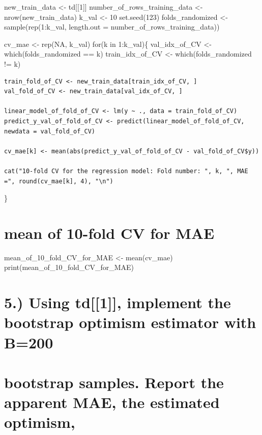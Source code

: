 \documentclass[
  letterpaper,
  DIV=11,
  numbers=noendperiod]{scrreprt}
\begin{document}
new\_train\_data \textless- td{[}{[}1{]}{]}
number\_of\_rows\_training\_data \textless- nrow(new\_train\_data)
k\_val \textless- 10 set.seed(123) folds\_randomized \textless-
sample(rep(1:k\_val, length.out = number\_of\_rows\_training\_data))

cv\_mae \textless- rep(NA, k\_val) for(k in 1:k\_val)\{ val\_idx\_of\_CV
\textless- which(folds\_randomized == k) train\_idx\_of\_CV \textless-
which(folds\_randomized != k)

\begin{verbatim}
train_fold_of_CV <- new_train_data[train_idx_of_CV, ]
val_fold_of_CV <- new_train_data[val_idx_of_CV, ]

linear_model_of_fold_of_CV <- lm(y ~ ., data = train_fold_of_CV)
predict_y_val_of_fold_of_CV <- predict(linear_model_of_fold_of_CV, newdata = val_fold_of_CV)

cv_mae[k] <- mean(abs(predict_y_val_of_fold_of_CV - val_fold_of_CV$y))

cat("10-fold CV for the regression model: Fold number: ", k, ", MAE =", round(cv_mae[k], 4), "\n")
\end{verbatim}

\}


\chapter{mean of 10-fold CV for MAE}\label{mean-of-10-fold-cv-for-mae}

mean\_of\_10\_fold\_CV\_for\_MAE \textless- mean(cv\_mae)
print(mean\_of\_10\_fold\_CV\_for\_MAE)


\chapter{5.) Using td{[}{[}1{]}{]}, implement the bootstrap optimism
estimator with
B=200}\label{using-td1-implement-the-bootstrap-optimism-estimator-with-b200}


\chapter{bootstrap samples. Report the apparent MAE, the estimated
optimism,}\label{bootstrap-samples.-report-the-apparent-mae-the-estimated-optimism}

\end{document}
